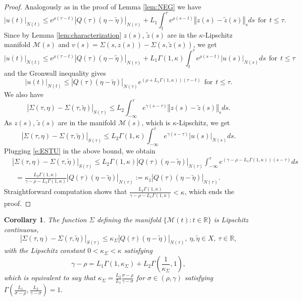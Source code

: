 \documentclass[a4paper,11pt,reqno]{amsart}
\theoremstyle{plain}
\newtheorem{cor}[lem]{Corollary}
\theoremstyle{definition}
\numberwithin{equation}{section}
\newcommand{\R}{\mathbb{R}}
\newcommand{\calm}{\mathcal M}
\newcommand{\norm}[1]{\left\Vert#1\right\Vert}
\renewcommand{\leq}{\leqslant}
\begin{document}
\begin{proof}
Analogously as in the proof of Lemma \ref{lem:NEG}  we have
$$|u(t)|_{N(t)}\leq e^{\rho(\tau-t)}|Q(\tau)(\eta-\tilde\eta)|_{N(\tau)}+L_1\int_{t}^{\tau}e^{\rho(s-t)}\norm{z(s)-\tilde{z}(s)}_{s}ds\ \ \text{for}\ \ t\leq\tau.$$
Since by Lemma \ref{lem:characterization} $z(s)$, $\tilde{z}(s)$ are in the $\kappa$-Lipschitz manifold $\calm(s)$ and $v(s)=\Sigma(s,z(s))-\Sigma(s,\tilde{z}(s))$, we get
$$|u(t)|_{N(t)}\leq e^{\rho(\tau-t)}|Q(\tau)(\eta-\tilde\eta)|_{N(\tau)}+L_1\Gamma(1,\kappa)\int_{t}^{\tau}e^{\rho(s-t)}|u(s)|_{N(s)}ds\ \ \text{for}\ \ t\leq\tau$$
and the Gronwall inequality gives
\begin{equation}\label{e:ESTU}
|u(t)|_{N(t)}\leq |Q(\tau)(\eta-\tilde\eta)|_{N(\tau)}e^{(\rho+L_1\Gamma(1,\kappa))(\tau-t)}\ \ \text{for}\ \  t\leq\tau.
\end{equation}
We also have
$$|\Sigma(\tau,\eta)-\Sigma(\tau,\tilde\eta)|_{S(\tau)}\leq L_2\int_{-\infty}^{\tau}e^{\gamma(s-\tau)}\norm{z(s)-\tilde{z}(s)}_{s}ds.$$
As $z(s)$, $\tilde{z}(s)$ are in the manifold $\calm(s)$, which is $\kappa$-Lipschitz, we get
$$|\Sigma(\tau,\eta)-\Sigma(\tau,\tilde\eta)|_{S(\tau)}\leq L_2\Gamma(1,\kappa)\int_{-\infty}^{\tau}e^{\gamma(s-\tau)}|u(s)|_{N(s)}ds.$$
Plugging \eqref{e:ESTU} in the above bound, we obtain
\begin{align*}
	&|\Sigma(\tau,\eta)-\Sigma(\tau,\tilde\eta)|_{S(\tau)}\leq L_2\Gamma(1,\kappa)|Q(\tau)(\eta-\tilde\eta)|_{N(\tau)}\int_{-\infty}^{\tau}e^{(\gamma-\rho-L_1\Gamma(1,\kappa))(s-\tau)}ds\\
& \ \ =\frac{L_2\Gamma(1,\kappa)}{\gamma-\rho-L_1\Gamma(1,\kappa)}|Q(\tau)(\eta-\tilde\eta)|_{N(\tau)}:=\kappa_1 |Q(\tau)(\eta-\tilde\eta)|_{N(\tau)}.
\end{align*}
Straightforward computation shows that $\frac{L_2\Gamma(1,\kappa)}{\gamma-\rho-L_1\Gamma(1,\kappa)} < \kappa$, which ends the proof.
\end{proof}

\begin{cor}\label{cor:betterlip}
The function $\Sigma$ defining the manifold $\{ \calm(t)\colon t\in \R\}$ is Lipschitz continuous,
\begin{equation}\label{e:SIGMALIPBETTER}
|\Sigma(\tau,\eta)-\Sigma(\tau,\tilde\eta)|_{S(\tau)}\leq\kappa_\Sigma|Q(\tau)(\eta-\tilde\eta)|_{N(\tau)},\ \eta,\tilde\eta\in X,\ \tau\in\R,
\end{equation}
with the Lipschitz constant $0<\kappa_\Sigma<\kappa$ satisfying
\begin{equation}\label{e:KAPPABEST}
\gamma-\rho=L_1\Gamma(1,\kappa_\Sigma)+L_2\Gamma\left(\frac{1}{\kappa_\Sigma},1\right),
\end{equation}
which is equivalent to say that $\kappa_\Sigma = \frac{L_2}{L_1}\frac{\sigma-\rho}{\gamma-\sigma}$ for $\sigma\in (\rho,\gamma)$ satisfying $\Gamma\left(\frac{L_1}{\sigma-\rho},\frac{L_2}{\gamma-\sigma}\right) = 1.$
\end{cor}
\end{document}
